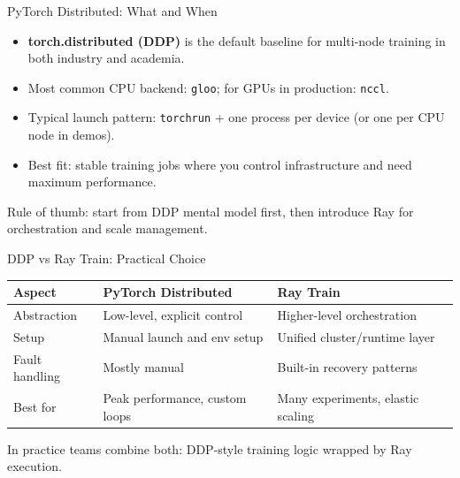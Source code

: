 \documentclass[aspectratio=169]{beamer}
\begin{document}
\begin{frame}[t]{PyTorch Distributed: What and When}
\begin{itemize}
    \item \textbf{torch.distributed (DDP)} is the default baseline for multi-node training in both industry and academia.
    \item Most common CPU backend: \texttt{gloo}; for GPUs in production: \texttt{nccl}.
    \item Typical launch pattern: \texttt{torchrun} + one process per device (or one per CPU node in demos).
    \item Best fit: stable training jobs where you control infrastructure and need maximum performance.
\end{itemize}
\vspace{1mm}
Rule of thumb: start from DDP mental model first, then introduce Ray for orchestration and scale management.
\end{frame}

\begin{frame}[t]{DDP vs Ray Train: Practical Choice}
\begin{tabular}{@{}p{3.0cm}p{4.0cm}p{4.3cm}@{}}
\toprule
Aspect & PyTorch Distributed & Ray Train \\
\midrule
Abstraction & Low-level, explicit control & Higher-level orchestration \\
Setup & Manual launch and env setup & Unified cluster/runtime layer \\
Fault handling & Mostly manual & Built-in recovery patterns \\
Best for & Peak performance, custom loops & Many experiments, elastic scaling \\
\bottomrule
\end{tabular}
\vspace{1mm}
In practice teams combine both: DDP-style training logic wrapped by Ray execution.
\end{frame}
\end{document}
